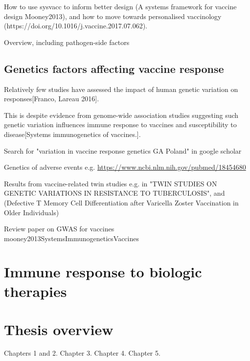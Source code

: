 How to use sysvacc to inform better design (A systems framework for vaccine design Mooney2013), and how to move towards personalised vaccinology (https://doi.org/10.1016/j.vaccine.2017.07.062).

Overview, including pathogen-side factors

\subsection{Genetics factors affecting vaccine response}

Relatively few studies have assessed the impact of human genetic variation on responses[Franco, Lareau 2016].

This is despite evidence from genome-wide association studies suggesting such genetic variation influences immune response to vaccines and susceptibility to disease[Systems immunogenetics of vaccines.].

Search for "variation in vaccine response genetics GA Poland" in google scholar

Genetics of adverse events e.g. \url{https://www.ncbi.nlm.nih.gov/pubmed/18454680}

Results from vaccine-related twin studies e.g. in "TWIN STUDIES ON GENETIC VARIATIONS IN RESISTANCE TO TUBERCULOSIS", and (Defective T Memory Cell Differentiation after Varicella Zoster Vaccination in Older Individuals)

Review paper on GWAS for vaccines mooney2013SystemsImmunogeneticsVaccines

\section{Immune response to biologic therapies}

\section{Thesis overview}

Chapters 1 and 2.
Chapter 3.
Chapter 4.
Chapter 5.
